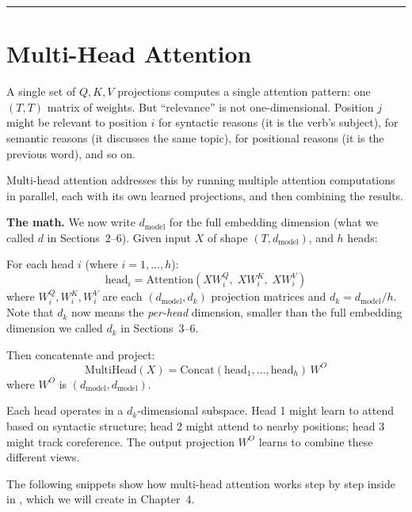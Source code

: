 
\bigskip\hrule\bigskip

\section{Multi-Head Attention}

A single set of $Q, K, V$ projections computes a single attention pattern: one $(T, T)$ matrix of weights. But ``relevance'' is not one-dimensional. Position $j$ might be relevant to position $i$ for syntactic reasons (it is the verb's subject), for semantic reasons (it discusses the same topic), for positional reasons (it is the previous word), and so on.

Multi-head attention addresses this by running multiple attention computations in parallel, each with its own learned projections, and then combining the results.

\textbf{The math.} We now write $d_{\text{model}}$ for the full embedding dimension (what we called $d$ in Sections~2--6). Given input $X$ of shape $(T, d_{\text{model}})$, and $h$ heads:

For each head $i$ (where $i = 1, \ldots, h$):
\[
\text{head}_i = \mathrm{Attention}(X W_i^Q,\; X W_i^K,\; X W_i^V)
\]
where $W_i^Q, W_i^K, W_i^V$ are each $(d_{\text{model}}, d_k)$ projection matrices and $d_k = d_{\text{model}} / h$. Note that $d_k$ now means the \emph{per-head} dimension, smaller than the full embedding dimension we called $d_k$ in Sections~3--6.

Then concatenate and project:
\[
\mathrm{MultiHead}(X) = \mathrm{Concat}(\text{head}_1, \ldots, \text{head}_h)\, W^O
\]
where $W^O$ is $(d_{\text{model}}, d_{\text{model}})$.

Each head operates in a $d_k$-dimensional subspace. Head 1 might learn to attend based on syntactic structure; head 2 might attend to nearby positions; head 3 might track coreference. The output projection $W^O$ learns to combine these different views.

The following snippets show how multi-head attention works step by step inside  in , which we will create in Chapter~4.

